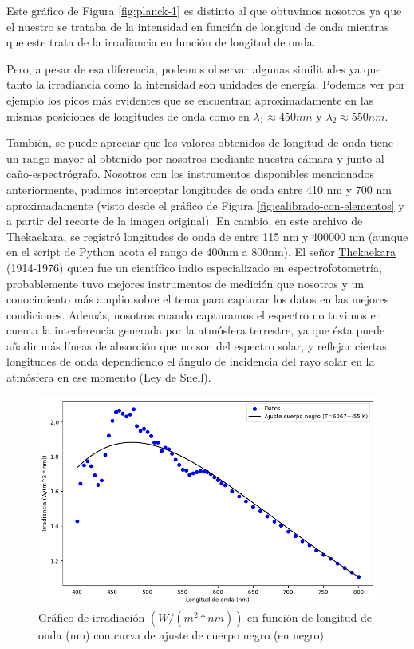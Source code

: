 \documentclass[11pt, a4paper]{article}
\begin{document}
Este gráfico de Figura \ref{fig:planck-1} es distinto al que obtuvimos nosotros ya que el nuestro se trataba de la intensidad en función de longitud de onda mientras que este trata de la irradiancia en función de longitud de onda. 

Pero, a pesar de esa diferencia, podemos observar algunas similitudes ya que tanto la irradiancia como la intensidad son unidades de energía. Podemos ver por ejemplo los picos más evidentes que se encuentran aproximadamente en las mismas posiciones de longitudes de onda como en $\lambda _1 \approx 450 nm$ y $\lambda _2 \approx 550 nm$.

También, se puede apreciar que los valores obtenidos de longitud de onda tiene un rango mayor al obtenido por nosotros mediante nuestra cámara y junto al caño-espectrógrafo. Nosotros con los instrumentos disponibles mencionados anteriormente, pudimos interceptar longitudes de onda entre 410 nm y 700 nm aproximadamente (visto desde el gráfico de Figura \ref{fig:calibrado-con-elementos} y a partir del recorte de la imagen original). En cambio, en este archivo de Thekaekara, se registró longitudes de onda de entre 115 nm y 400000 nm (aunque en el script de Python acota el rango de 400nm a 800nm). El señor \href{https://en.wikipedia.org/wiki/Matthew_Pothen_Thekaekara}{Thekaekara} (1914-1976) quien fue un científico indio especializado en espectrofotometría, probablemente tuvo mejores instrumentos de medición que nosotros y un conocimiento más amplio sobre el tema para capturar los datos en las mejores condiciones. 
Además, nosotros cuando capturamos el espectro no tuvimos en cuenta la interferencia generada por la atmósfera terrestre, ya que ésta puede añadir más líneas de absorción que no son del espectro solar, y  reflejar ciertas longitudes de onda dependiendo el ángulo de incidencia del rayo solar en la atmósfera en ese momento (Ley de Snell).

\begin{figure}[H]
    \centering
    \includegraphics[width=1\linewidth]{images/Copy of grafico_con_ajuste_planck.png}
    \captionsetup{justification=centering}
    \caption{Gráfico de irradiación $(W/(m^2*nm))$ en función de longitud de onda (nm) con curva de ajuste de cuerpo negro (en negro)}
    \label{fig:planck-2}
\end{figure}
\end{document}
